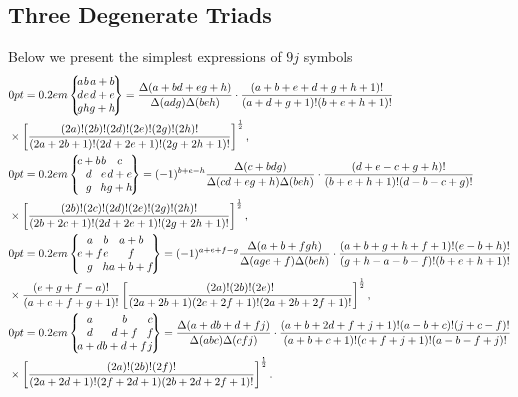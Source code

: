 \subsection{Three Degenerate Triads}\label{sec:10.8.4}
Below we present the simplest expressions of $9 j$ symbols
\begin{align}
& \ninej{a}{b}{a+b}{d}{e}{d+e}{g}{h}{g+h}=\frac{\Delta(a+b d+e g+h)}{\Delta(a d g) \Delta(b e h)} \cdot \frac{(a+b+e+d+g+h+1)!}{(a+d+g+1)!(b+e+h+1)!}  \notag\\
& \times\left[\frac{(2 a)!(2 b)!(2 d)!(2 e)!(2 g)!(2 h)!}{(2 a+2 b+1)!(2 d+2 e+1)!(2 g+2 h+1)!}\right]^{\frac{1}{2}},  \label{eq:10:8:14}\\
& \ninej{c+b}{b}{c}{d}{e}{d+e}{g}{h}{g+h}=(-1)^{b+e-h} \frac{\Delta(c+b d g)}{\Delta(c d+e g+h) \Delta(b e h)} \cdot \frac{(d+e-c+g+h)!}{(b+e+h+1)!(d-b-c+g)!}  \notag\\
& \times\left[\frac{(2 b)!(2 c)!(2 d)!(2 e)!(2 g)!(2 h)!}{(2 b+2 c+1)!(2 d+2 e+1)!(2 g+2 h+1)!}\right]^{\frac{1}{2}},  \label{eq:10:8:15}\\
& \ninej{a}{b}{a+b}{e+f}{e}{f}{g}{h}{a+b+f}=(-1)^{a+e+f-g} \frac{\Delta(a+b+f g h)}{\Delta(a g e+f) \Delta(b e h)} \cdot \frac{(a+b+g+h+f+1)!(e-b+h)!}{(g+h-a-b-f)!(b+e+h+1)!}  \notag\\
& \times \frac{(e+g+f-a)!}{(a+e+f+g+1)!}\left[\frac{(2 a)!(2 b)!(2 e)!}{(2 a+2 b+1)(2 e+2 f+1)!(2 a+2 b+2 f+1)!}\right]^{\frac{1}{2}},  \label{eq:10:8:16}\\
& \ninej{a}{b}{c}{d}{d+f}{f}{a+d}{b+d+f}{j}=\frac{\Delta(a+d b+d+f j)}{\Delta(a b c) \Delta(c f j)} \cdot \frac{(a+b+2 d+f+j+1)!(a-b+c)!(j+c-f)!}{(a+b+c+1)!(c+f+j+1)!(a-b-f+j)!}  \notag\\
& \times\left[\frac{(2 a)!(2 b)!(2 f)!}{(2 a+2 d+1)!(2 f+2 d+1)(2 b+2 d+2 f+1)!}\right]^{\frac{1}{2}} . \label{eq:10:8:17}
\end{align}
